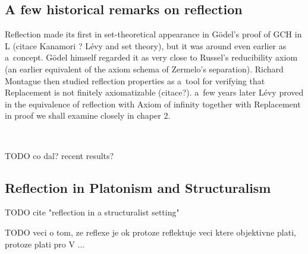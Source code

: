 \documentclass[12pt,a4paper]{article}
\begin{document}

\subsection{A few historical remarks on reflection}\label{sec:History}  %
 
 
Reflection made its first in set-theoretical appearance in G{\"o}del's proof of GCH in L  (citace Kanamori ? Lévy and set theory), but it was around even earlier as a~concept. G{\"o}del himself regarded it as very close to Russel's reducibility axiom (an earlier equivalent of the axiom schema of Zermelo's separation). Richard Montague then studied reflection properties as a~tool for verifying that Replacement is not finitely axiomatizable (citace?). a~few years later Lévy proved in \cite{Levy60a} the equivalence of reflection with Axiom of infinity together with Replacement in proof we shall examine closely in chaper 2.

\

TODO co dal? recent results?

\subsection{Reflection in Platonism and Structuralism}
TODO cite "reflection in a structuralist setting"

TODO veci o tom, ze reflexe je ok protoze reflektuje veci ktere objektivne plati, protoze plati pro V ...
\end{document}
